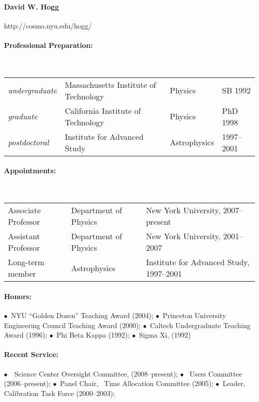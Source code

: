 \documentclass[letterpaper,12pt]{article}
\begin{document}
\paragraph{David W. Hogg} http://cosmo.nyu.edu/hogg/

\paragraph{Professional Preparation:}~\\[3pt]
\begin{tabular}{llll}
\textsl{undergraduate}
  & Massachusetts Institute of Technology & Physics & SB 1992\\
\textsl{graduate}
  & California Institute of Technology    & Physics & PhD 1998\\
\textsl{postdoctoral}
  & Institute for Advanced Study          & Astrophysics & 1997--2001
\end{tabular}
           
\paragraph{Appointments:}~\\[3pt]
\begin{tabular}{lll}
Associate Professor & Department of Physics & New York University, 2007--present\\
Assistant Professor & Department of Physics & New York University, 2001--2007\\
Long-term member & Astrophysics & Institute for Advanced Study, 1997--2001 \\
\end{tabular}

\paragraph{Honors:}
$\bullet$~NYU ``Golden Dozen'' Teaching Award (2004);
$\bullet$~Princeton University Engineering Council Teaching Award (2000);
$\bullet$~Caltech Undergraduate Teaching Award (1996);
$\bullet$~Phi Beta Kappa (1992);
$\bullet$~Sigma Xi, (1992)

\paragraph{Recent Service:}
$\bullet$~\Spitzer\ Science Center Oversight Committee, (2008--present); 
$\bullet$~ Users Committee (2006--present);
$\bullet$~Panel Chair, \Spitzer\ Time Allocation Committee (2005);
$\bullet$~Leader,  Calibration Task Force (2000--2003);
\end{document}
